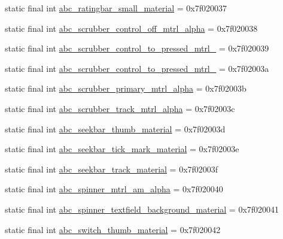 \begin{CompactItemize}
static final int \hyperlink{classandroid_1_1support_1_1v7_1_1mediarouter_1_1_r_1_1drawable_f5a7e9b9216be6f56a0b20ed2b5b8953}{abc\_\-ratingbar\_\-small\_\-material} = 0x7f020037
\item 
static final int \hyperlink{classandroid_1_1support_1_1v7_1_1mediarouter_1_1_r_1_1drawable_cd98c87e7f62898a6f53be470ecfd12f}{abc\_\-scrubber\_\-control\_\-off\_\-mtrl\_\-alpha} = 0x7f020038
\item 
static final int \hyperlink{classandroid_1_1support_1_1v7_1_1mediarouter_1_1_r_1_1drawable_09b5b1166adb5582a0b071f9e693542d}{abc\_\-scrubber\_\-control\_\-to\_\-pressed\_\-mtrl\_} = 0x7f020039
\item 
static final int \hyperlink{classandroid_1_1support_1_1v7_1_1mediarouter_1_1_r_1_1drawable_17e53ffca9968fb8139a69d4b8c7d8d3}{abc\_\-scrubber\_\-control\_\-to\_\-pressed\_\-mtrl\_} = 0x7f02003a
\item 
static final int \hyperlink{classandroid_1_1support_1_1v7_1_1mediarouter_1_1_r_1_1drawable_b8fe3f476a2bafa3fe35a99581ff5922}{abc\_\-scrubber\_\-primary\_\-mtrl\_\-alpha} = 0x7f02003b
\item 
static final int \hyperlink{classandroid_1_1support_1_1v7_1_1mediarouter_1_1_r_1_1drawable_18f5c1a7dbd7f2ed30251451350c2bdd}{abc\_\-scrubber\_\-track\_\-mtrl\_\-alpha} = 0x7f02003c
\item 
static final int \hyperlink{classandroid_1_1support_1_1v7_1_1mediarouter_1_1_r_1_1drawable_3779a28d0c9a8225582cb5837a610194}{abc\_\-seekbar\_\-thumb\_\-material} = 0x7f02003d
\item 
static final int \hyperlink{classandroid_1_1support_1_1v7_1_1mediarouter_1_1_r_1_1drawable_f44064d3be2d44a76af5f3f35b018f08}{abc\_\-seekbar\_\-tick\_\-mark\_\-material} = 0x7f02003e
\item 
static final int \hyperlink{classandroid_1_1support_1_1v7_1_1mediarouter_1_1_r_1_1drawable_f1747a66594335588f692f56835b137a}{abc\_\-seekbar\_\-track\_\-material} = 0x7f02003f
\item 
static final int \hyperlink{classandroid_1_1support_1_1v7_1_1mediarouter_1_1_r_1_1drawable_75a65a81827cc33256ee6e8655d9b978}{abc\_\-spinner\_\-mtrl\_\-am\_\-alpha} = 0x7f020040
\item 
static final int \hyperlink{classandroid_1_1support_1_1v7_1_1mediarouter_1_1_r_1_1drawable_af46a4011326d100a8d99562b58473bd}{abc\_\-spinner\_\-textfield\_\-background\_\-material} = 0x7f020041
\item 
static final int \hyperlink{classandroid_1_1support_1_1v7_1_1mediarouter_1_1_r_1_1drawable_c9a9dbab3b28dc067a5cfbcc047b6113}{abc\_\-switch\_\-thumb\_\-material} = 0x7f020042

\end{CompactItemize}
